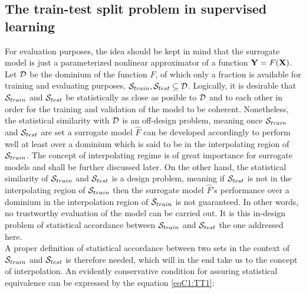 \subsection{The train-test split problem in supervised learning}
\indent For evaluation purposes, the idea should be kept in mind that the surrogate model is just a parameterized nonlinear approximator of a function ${\bf{Y}}=F({\bf X})$. Let $\cal D$ be the dominium of the function $F$, of which only a fraction is available for training and evaluating purposes, \ie ${\cal S}_{train},{\cal S}_{test} \subseteq \cal D$. Logically, it is desirable that  
${\cal S}_{train}$ and ${\cal S}_{test}$ be statistically as close as posible to $\cal D$ and to each other in order for the training and validation of the model to be coherent. Nonetheless, the statistical similarity with $\cal D$ is an off-design problem, meaning once ${\cal S}_{train}$ and ${\cal S}_{test}$ are set a surrogate model $\hat F$ can be developed accordingly to perform well at least over a dominium which is said to be in the interpolating region of ${\cal S}_{train}$. The concept of interpolating regime is of great importance for surrogate models and shall be further discussed later. On the other hand, the statistical similarity of ${\cal S}_{train}$ and ${\cal S}_{test}$ is a design problem, meaning if ${\cal S}_{test}$ is not in the interpolating region of ${\cal S}_{train}$ then the surrogate model $\hat F$'s performance over a dominium in the interpolation region of ${\cal S}_{train}$ is not guaranteed. In other words, no trustworthy evaluation of the model can be carried out. It is this in-design problem of statistical accordance between ${\cal S}_{train}$ and ${\cal S}_{test}$ the one addressed here.\\
A proper definition of statistical accordance between two sets in the context of ${\cal S}_{train}$ and ${\cal S}_{test}$ is therefore needed, which will in the end take us to the concept of interpolation. An evidently conservative condition for assuring statistical equivalence can be expressed by the equation \eqref{eqC1:TT1}:


